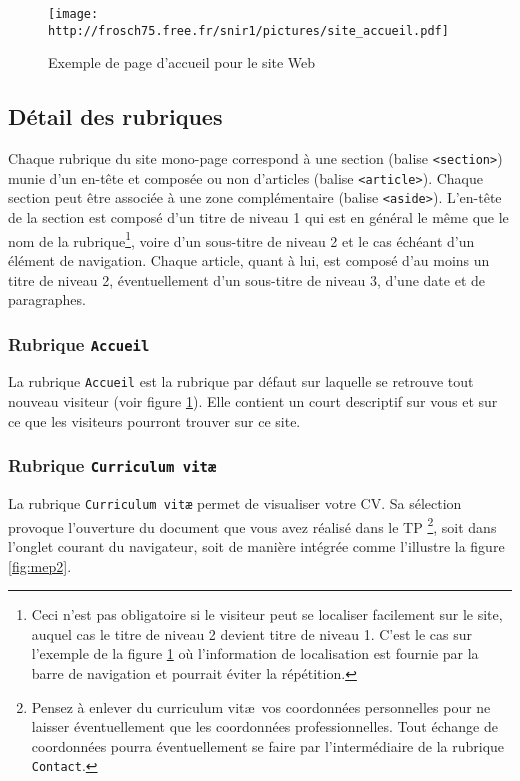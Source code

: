 \documentclass[a4paper,12pt]{article}
\newcommand\Code[1]{\textcolor{couleur_code}{\texttt{#1}}}
\begin{document}
\begin{figure}[htbp]
  \begin{center}
    \texttt{[image: http://frosch75.free.fr/snir1/pictures/site\_accueil.pdf]} 
    \caption{Exemple de page d'accueil pour le site Web}
    \label{fig:mep1} 
  \end{center}
\end{figure}

\subsection{Détail des rubriques}
Chaque rubrique du site mono-page correspond à une section (balise 
\Code{<section>}) munie d'un en-tête et composée ou non d'articles 
(balise \Code{<article>}). Chaque section peut être associée à une zone 
complémentaire (balise \texttt{<aside>}). 
L'en-tête de la section est composé d'un titre de niveau 1 qui est en général 
le même que le nom de la rubrique\footnote{Ceci n'est pas obligatoire si le 
visiteur peut se localiser facilement sur le site, auquel cas le titre de 
niveau 2 devient titre de niveau 1. C'est le cas sur l'exemple de la figure 
\ref{fig:mep1} où l'information de localisation est fournie par la barre 
de navigation et pourrait éviter la répétition.}, voire d'un sous-titre de 
niveau 2 et le cas échéant d'un élément de navigation. Chaque article, quant 
à lui, est composé d'au moins un titre de niveau 2, éventuellement d'un 
sous-titre de niveau 3, d'une date et de paragraphes. 
        
\subsubsection{Rubrique \Code{Accueil}}
La rubrique \Code{Accueil} est la rubrique par défaut sur laquelle se retrouve
tout nouveau visiteur (voir figure \ref{fig:mep1}). Elle contient un court 
descriptif sur vous et sur ce que les visiteurs pourront trouver sur ce site. 

\subsubsection{Rubrique \Code{Curriculum vit\ae}}
La rubrique \Code{Curriculum vit\ae} permet de visualiser votre CV. Sa 
sélection provoque l'ouverture du document que vous avez réalisé dans le TP \footnote{Pensez à enlever du curriculum vit\ae ~vos coordonnées personnelles 
pour ne laisser éventuellement que les coordonnées professionnelles. Tout 
échange de coordonnées pourra éventuellement se faire par l'intermédiaire de 
la rubrique \Code{Contact}.}, soit dans l'onglet courant du navigateur, soit 
de manière intégrée comme l'illustre la figure \ref{fig:mep2}.
\end{document}

